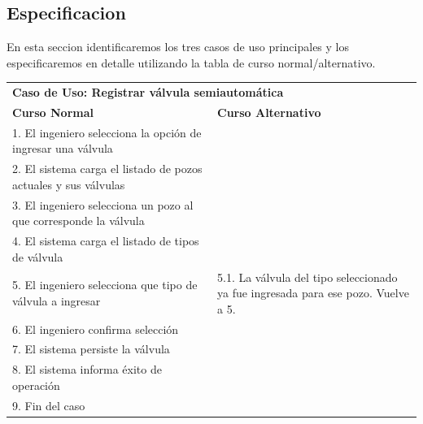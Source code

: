 \documentclass{article}
\theoremstyle{definition}
\theoremstyle{remark}
\begin{document}
\subsection{Especificacion}

\newcommand{\curef}[1]{\textbf{Caso de uso \ref{cu:#1}}}
\newcommand{\cutitle}[1]{\renewcommand{\givencutitle}{#1}}
\newcommand{\cuactors}[1]{\renewcommand{\givencuactors}{#1}}
\newcommand{\cupre}[1]{\renewcommand{\givencupre}{#1}}
\newcommand{\cupost}[1]{\renewcommand{\givencupost}{#1}}
\newcommand{\cucourse}[1]{\renewcommand{\givencucourse}{#1}}
\newcommand{\culabel}[1]{\renewcommand{\givenculabel}{#1}}
\newcommand{\cucaption}[1]{\renewcommand{\givencucaption}{#1}}
\newcommand{\givencutitle}{REQUIRED!}
\newcommand{\givencuactors}{REQUIRED!}
\newcommand{\givencupre}{-}
\newcommand{\givencupost}{-}
\newcommand{\givencucourse}{REQUIRED!}
\newcommand{\givenculabel}{REQUIRED!}
\newcommand{\givencucaption}{} %

\newenvironment{casodeuso}
{\begin{table}[H]}{%
\begin{tabular}{|p{0.5\linewidth} p{0.5\linewidth}|}\hline
\multicolumn{2}{|l|}{\textbf{Caso de Uso: \givencutitle}} \\
\vspace{1px}\textbf{Curso Normal} & \vspace{1px}\textbf{Curso Alternativo} \\
\givencucourse
\hline
\end{tabular}
\label{cu:\givenculabel}
\end{table}}

En esta seccion identificaremos los tres casos de uso principales y los especificaremos en detalle utilizando la tabla de curso normal/alternativo.

\begin{casodeuso}
  \cutitle{Registrar válvula semiautomática}
  \cucourse{
    1. El ingeniero selecciona la opción de ingresar una válvula & \\
    2. El sistema carga el listado de pozos actuales y sus válvulas \\
    3. El ingeniero selecciona un pozo al que corresponde la válvula & \\
    4. El sistema carga el listado de tipos de válvula & \\
    5. El ingeniero selecciona que tipo de válvula a ingresar & 5.1. La válvula del tipo seleccionado ya fue ingresada para ese pozo. Vuelve a 5. \\
    6. El ingeniero confirma selección & \\
    7. El sistema persiste la válvula & \\
    8. El sistema informa éxito de operación & \\
    9. Fin del caso & \\
  }
  \culabel{regval}
\end{casodeuso}
\end{document}
